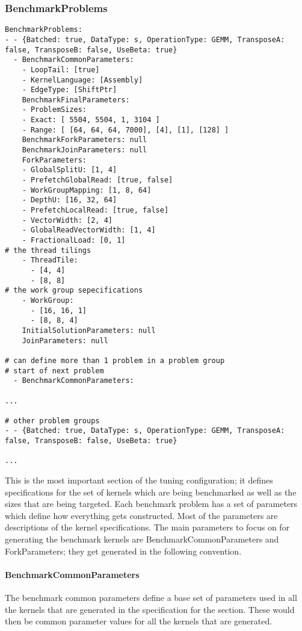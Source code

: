 \documentclass[]{article}
\begin{document}
\subsubsection{BenchmarkProblems}
\begin{verbatim}
BenchmarkProblems:
- - {Batched: true, DataType: s, OperationType: GEMM, TransposeA: false, TransposeB: false, UseBeta: true}
  - BenchmarkCommonParameters:
    - LoopTail: [true]
    - KernelLanguage: [Assembly]
    - EdgeType: [ShiftPtr]
    BenchmarkFinalParameters:
    - ProblemSizes:
    - Exact: [ 5504, 5504, 1, 3104 ]
    - Range: [ [64, 64, 64, 7000], [4], [1], [128] ]
    BenchmarkForkParameters: null
    BenchmarkJoinParameters: null
    ForkParameters:
    - GlobalSplitU: [1, 4]
    - PrefetchGlobalRead: [true, false]
    - WorkGroupMapping: [1, 8, 64]
    - DepthU: [16, 32, 64]
    - PrefetchLocalRead: [true, false]
    - VectorWidth: [2, 4]
    - GlobalReadVectorWidth: [1, 4]
    - FractionalLoad: [0, 1]
# the thread tilings
    - ThreadTile:
      - [4, 4]
      - [8, 8]
# the work group sepecifications
    - WorkGroup:
      - [16, 16, 1]
      - [8, 8, 4]
    InitialSolutionParameters: null
    JoinParameters: null

# can define more than 1 problem in a problem group
# start of next problem
  - BenchmarkCommonParameters:

...

# other problem groups
- - {Batched: true, DataType: s, OperationType: GEMM, TransposeA: false, TransposeB: false, UseBeta: true}

...

\end{verbatim}

This is the most important section of the tuning configuration; it defines specifications for the set of kernels which are being benchmarked as well as the sizes that are being targeted. Each benchmark problem has a set of parameters which define how everything gets constructed. Most of the parameters are descriptions of the kernel specifications. The main parameters to focus on for generating the benchmark kernels are BenchmarkCommonParameters and ForkParameters; they get generated in the following convention.

\paragraph{BenchmarkCommonParameters} The benchmark common parameters define a base set of parameters used in all the kernels that are generated in the specification for the section. These would then be common parameter values for all the kernels that are generated.
\end{document}
